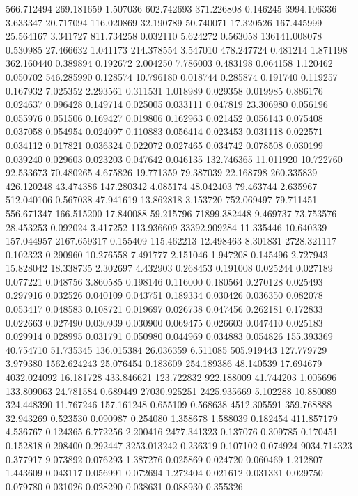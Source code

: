 566.712494
269.181659
1.507036
602.742693
371.226808
0.146245
3994.106336
3.633347
20.717094
116.020869
32.190789
50.740071
17.320526
167.445999
25.564167
3.341727
811.734258
0.032110
5.624272
0.563058
136141.008078
0.530985
27.466632
1.041173
214.378554
3.547010
478.247724
0.481214
1.871198
362.160440
0.389894
0.192672
2.004250
7.786003
0.483198
0.064158
1.120462
0.050702
546.285990
0.128574
10.796180
0.018744
0.285874
0.191740
0.119257
0.167932
7.025352
2.293561
0.311531
1.018989
0.029358
0.019985
0.886176
0.024637
0.096428
0.149714
0.025005
0.033111
0.047819
23.306980
0.056196
0.055976
0.051506
0.169427
0.019806
0.162963
0.021452
0.056143
0.075408
0.037058
0.054954
0.024097
0.110883
0.056414
0.023453
0.031118
0.022571
0.034112
0.017821
0.036324
0.022072
0.027465
0.034742
0.078508
0.030199
0.039240
0.029603
0.023203
0.047642
0.046135
132.746365
11.011920
10.722760
92.533673
70.480265
4.675826
19.771359
79.387039
22.168798
260.335839
426.120248
43.474386
147.280342
4.085174
48.042403
79.463744
2.635967
512.040106
0.567038
47.941619
13.862818
3.153720
752.069497
79.711451
556.671347
166.515200
17.840088
59.215796
71899.382448
9.469737
73.753576
28.453253
0.092024
3.417252
113.936609
33392.909284
11.335446
10.640339
157.044957
2167.659317
0.155409
115.462213
12.498463
8.301831
2728.321117
0.102323
0.290960
10.276558
7.491777
2.151046
1.947208
0.145496
2.727943
15.828042
18.338735
2.302697
4.432903
0.268453
0.191008
0.025244
0.027189
0.077221
0.048756
3.860585
0.198146
0.116000
0.180564
0.270128
0.025493
0.297916
0.032526
0.040109
0.043751
0.189334
0.030426
0.036350
0.082078
0.053417
0.048583
0.108721
0.019697
0.026738
0.047456
0.262181
0.172833
0.022663
0.027490
0.030939
0.030900
0.069475
0.026603
0.047410
0.025183
0.029914
0.028995
0.031791
0.050980
0.044969
0.034883
0.054826
155.393369
40.754710
51.735345
136.015384
26.036359
6.511085
505.919443
127.779729
3.979380
1562.624243
25.076454
0.183609
254.189386
48.140539
17.694679
4032.024092
16.181728
433.846621
123.722832
922.188009
41.744203
1.005696
133.809063
24.781584
0.689449
27030.925251
2425.935669
5.102288
10.880089
324.448390
11.767246
157.161248
0.655109
0.568638
4512.305591
359.768888
32.943269
0.523530
0.090987
0.254080
1.358678
1.588039
0.182454
411.857179
4.536767
0.124365
6.772256
2.200416
2477.341323
0.137076
0.309785
0.170451
0.152818
0.298400
0.292447
3253.013242
0.236319
0.107102
0.074924
9034.714323
0.377917
9.073892
0.076293
1.387276
0.025869
0.024720
0.060469
1.212807
1.443609
0.043117
0.056991
0.072694
1.272404
0.021612
0.031331
0.029750
0.079780
0.031026
0.028290
0.038631
0.088930
0.355326
